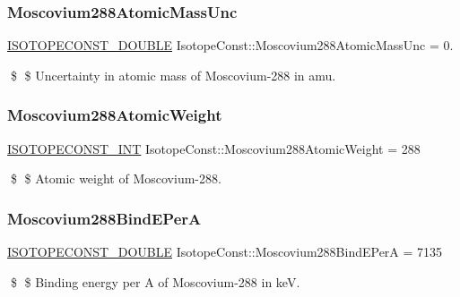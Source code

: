 \subsubsection{\texorpdfstring{Moscovium288\+Atomic\+Mass\+Unc}{Moscovium288AtomicMassUnc}}
{\footnotesize\ttfamily \mbox{\hyperlink{group___isotope_const-_macros_ga8f45a7272ce02c0b4c65c44636ed719a}{I\+S\+O\+T\+O\+P\+E\+C\+O\+N\+S\+T\+\_\+\+D\+O\+U\+B\+LE}} Isotope\+Const\+::\+Moscovium288\+Atomic\+Mass\+Unc = 0.}

\$ \$ Uncertainty in atomic mass of Moscovium-\/288 in amu. \mbox{\label{group___isotope_const-_moscovium-_mc288_ga2221e914feffda9a07a0ad1cb7174e92}} 
\subsubsection{\texorpdfstring{Moscovium288\+Atomic\+Weight}{Moscovium288AtomicWeight}}
{\footnotesize\ttfamily \mbox{\hyperlink{group___isotope_const-_macros_ga5f18360b3e99483a35c32d789e62621c}{I\+S\+O\+T\+O\+P\+E\+C\+O\+N\+S\+T\+\_\+\+I\+NT}} Isotope\+Const\+::\+Moscovium288\+Atomic\+Weight = 288}

\$ \$ Atomic weight of Moscovium-\/288. \mbox{\label{group___isotope_const-_moscovium-_mc288_ga38e9abb2bc20fec9958465e18d55c952}} 
\subsubsection{\texorpdfstring{Moscovium288\+Bind\+E\+PerA}{Moscovium288BindEPerA}}
{\footnotesize\ttfamily \mbox{\hyperlink{group___isotope_const-_macros_ga8f45a7272ce02c0b4c65c44636ed719a}{I\+S\+O\+T\+O\+P\+E\+C\+O\+N\+S\+T\+\_\+\+D\+O\+U\+B\+LE}} Isotope\+Const\+::\+Moscovium288\+Bind\+E\+PerA = 7135}

\$ \$ Binding energy per A of Moscovium-\/288 in keV. \mbox{\label{group___isotope_const-_moscovium-_mc288_gab4fd668968ef8046cfdd3ef7a1d0aa21}} 
